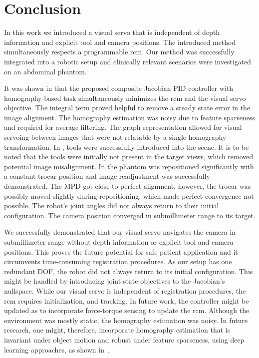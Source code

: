 \section{Conclusion}
\label{c2:sec:conclusions}
In this work we introduced a visual servo that is independent of depth information and explicit tool and camera positions. The introduced method simultaneously respects a programmable \acrshort{rcm}. Our method was successfully integrated into a robotic setup and clinically relevant scenarios were investigated on an abdominal phantom.

It was shown in  that the proposed composite Jacobian PID controller with homography-based task simultaneously minimizes the \acrshort{rcm} and the visual servo objective. The integral term proved helpful to remove a steady state error in the image alignment. The homography estimation was noisy due to feature sparseness and required for average filtering. The graph representation allowed for visual servoing between images that were not relatable by a single homography transformation. In , tools were successfully introduced into the scene. It is to be noted that the tools were initially not present in the target views, which removed potential image misalignment. In  the phantom was repositioned significantly with a constant trocar position and image readjustment was successfully demonstrated. The MPD got close to perfect alignment, however, the trocar was possibly moved slightly during repositioning, which made perfect convergence not possible. The robot's joint angles did not always return to their initial configuration. The camera position converged in submillimeter range to its target.

We successfully demonstrated that our visual servo navigates the camera in submillimeter range without depth information or explicit tool and camera positions. This proves the future potential for safe patient application and it circumvents time-consuming registration procedures. As our setup has one redundant DOF, the robot did not always return to its initial configuration. This might be handled by introducing joint state objectives to the Jacobian's nullspace. While our visual servo is independent of registration procedures, the \acrshort{rcm} requires initialization, and tracking. In future work, the controller might be updated as to incorporate force-torque sensing to update the \acrshort{rcm}. Although the environment was mostly static, the homography estimation was noisy. In future research, one might, therefore, incorporate homography estimation that is invariant under object motion and robust under feature sparseness, using deep learning approaches, as shown in~\cite{huber2022deep}.
